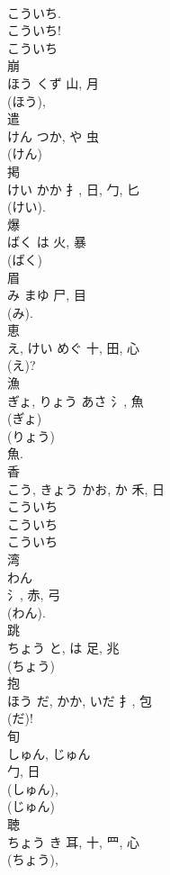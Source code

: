 \documentclass[8pt]{extreport}
\begin{document}
\begin{CJK}{UTF8}{min}
\\	こういち. 
\\	こういち! 
\\	こういち 
\\	崩	
\\	ほう	くず	山, 月	
\\	(ほう), 
\\	遣	
\\	けん	つか, や	虫	
\\	(けん) 
\\	掲	
\\	けい	かか	扌, 日, 勹, 匕	
\\	(けい). 
\\	爆	
\\	ばく	は	火, 暴	
\\	(ばく) 
\\	眉	
\\	み	まゆ	尸, 目		
\\	(み). 
\\	恵	
\\	え, けい	めぐ	十, 田, 心	
\\	(え)? 
\\	漁	
\\	ぎょ, りょう	あさ	氵, 魚	
\\	(ぎょ) 
\\	(りょう) 
\\	魚.	
\\	香	
\\	こう, きょう	かお, か	禾, 日	
\\	こういち 
\\	こういち
\\	こういち
\\	湾	
\\	わん	
\\	氵, 赤, 弓	
\\	(わん). 
\\	跳	
\\	ちょう	と, は	足, 兆	
\\	(ちょう) 
\\	抱	
\\	ほう	だ, かか, いだ	扌, 包	
\\	(だ)! 
\\	旬	
\\	しゅん, じゅん	
\\	勹, 日	
\\	(しゅん), 
\\	(じゅん) 
\\	聴	
\\	ちょう	き	耳, 十, 罒, 心	
\\	(ちょう), 

\end{CJK}
\end{document}
